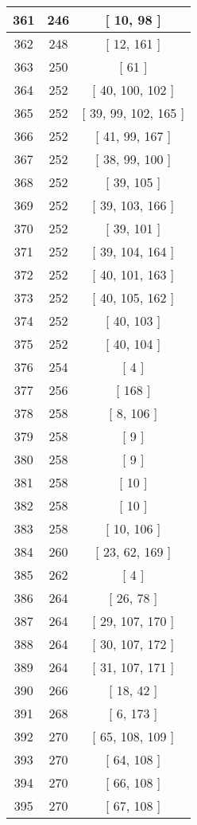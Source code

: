 \begin{center}
\begin{longtable}[H]{|| c c c ||}
\hline
361 & 246 & [ 10, 98 ] \\ 
\hline
362 & 248 & [ 12, 161 ] \\ 
\hline
363 & 250 & [ 61 ] \\ 
\hline
364 & 252 & [ 40, 100, 102 ] \\ 
\hline
365 & 252 & [ 39, 99, 102, 165 ] \\ 
\hline
366 & 252 & [ 41, 99, 167 ] \\ 
\hline
367 & 252 & [ 38, 99, 100 ] \\ 
\hline
368 & 252 & [ 39, 105 ] \\ 
\hline
369 & 252 & [ 39, 103, 166 ] \\ 
\hline
370 & 252 & [ 39, 101 ] \\ 
\hline
371 & 252 & [ 39, 104, 164 ] \\ 
\hline
372 & 252 & [ 40, 101, 163 ] \\ 
\hline
373 & 252 & [ 40, 105, 162 ] \\ 
\hline
374 & 252 & [ 40, 103 ] \\ 
\hline
375 & 252 & [ 40, 104 ] \\ 
\hline
376 & 254 & [ 4 ] \\ 
\hline
377 & 256 & [ 168 ] \\ 
\hline
378 & 258 & [ 8, 106 ] \\ 
\hline
379 & 258 & [ 9 ] \\ 
\hline
380 & 258 & [ 9 ] \\ 
\hline
381 & 258 & [ 10 ] \\ 
\hline
382 & 258 & [ 10 ] \\ 
\hline
383 & 258 & [ 10, 106 ] \\ 
\hline
384 & 260 & [ 23, 62, 169 ] \\ 
\hline
385 & 262 & [ 4 ] \\ 
\hline
386 & 264 & [ 26, 78 ] \\ 
\hline
387 & 264 & [ 29, 107, 170 ] \\ 
\hline
388 & 264 & [ 30, 107, 172 ] \\ 
\hline
389 & 264 & [ 31, 107, 171 ] \\ 
\hline
390 & 266 & [ 18, 42 ] \\ 
\hline
391 & 268 & [ 6, 173 ] \\ 
\hline
392 & 270 & [ 65, 108, 109 ] \\ 
\hline
393 & 270 & [ 64, 108 ] \\ 
\hline
394 & 270 & [ 66, 108 ] \\ 
\hline
395 & 270 & [ 67, 108 ] \\ 

\end{longtable}
\end{center}
